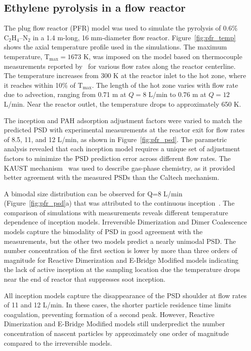 \subsection{Ethylene pyrolysis in a flow reactor}
The plug flow reactor (PFR) model was used to simulate the pyrolysis of 0.6\% $\mathrm{C_2H_4}$–$\mathrm{N_2}$ in a 1.4 m-long, 16 mm-diameter flow reactor. Figure~\ref{fig:pfr_temp} shows the axial temperature profile used in the simulations. The maximum temperature, $\mathrm{T_{max}} = 1673$ K, was imposed on the model based on thermocouple measurements reported by~\citet{mei2019quantitative} for various flow rates along the reactor centerline. The temperature increases from 300 K at the reactor inlet to the hot zone, where it reaches within 10\% of $\mathrm{T_{max}}$. The length of the hot zone varies with flow rate due to advection, ranging from 0.71 m at $Q = 8$ L/min to 0.76 m at $Q = 12$ L/min. Near the reactor outlet, the temperature drops to approximately 650 K.

The inception and PAH adsorption adjustment factors were varied to match the predicted PSD with experimental measurements at the reactor exit for flow rates of 8.5, 11, and 12 L/min, as shown in Figure~\ref{fig:pfr_psd}. The parametric analysis revealed that each inception model requires a unique set of adjustment factors to minimize the PSD prediction error across different flow rates. The KAUST mechanism~\citep{wang2013pah} was used to describe gas-phase chemistry, as it provided better agreement with the measured PSDs than the Caltech mechanism.

A bimodal size distribution can be observed for Q=8 L/min (Figure~\ref{fig:pfr_psd}a) that was attributed to the continuous inception~\citep{zhao2003measurement}. The comparison of simulations with measurements reveals different temperature dependence of inception models. Irreversible Dimerization and Dimer Coalescence models capture the bimodality of PSD in good agreement with the measurements, but the other two models predict a nearly unimodal PSD. The number concentration of the first section is lower by more than three orders of magnitude for Reactive Dimerization and E-Bridge Modified models indicating the lack of active inception at the sampling location due the temperature drops near the end of reactor that suppresses soot inception.

All inception models capture the disappearance of the PSD shoulder at flow rates of 11 and 12 L/min. In these cases, the shorter particle residence time limits coagulation, preventing formation of a second peak. However, Reactive Dimerization and E-Bridge Modified models still underpredict the number concentration of nascent particles by approximately one order of magnitude compared to the irreversible models.

